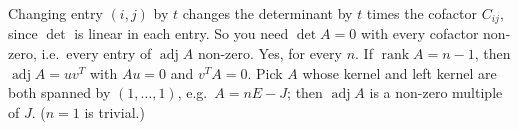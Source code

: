 \documentclass[11pt,a4paper]{article}
\begin{document}
Changing entry \((i,j)\) by \(t\) changes the determinant by \(t\) times the cofactor \(C_{ij}\), since \(\det\) is linear in each entry. So you need \(\det A=0\) with every cofactor non-zero, i.e.~every entry of \(\operatorname{adj}A\) non-zero.
Yes, for every \(n\). If \(\operatorname{rank}A=n-1\), then \(\operatorname{adj}A=uv^T\) with \(Au=0\) and \(v^TA=0\). Pick \(A\) whose kernel and left kernel are both spanned by \((1,\dots,1)\), e.g.~\(A=nE-J\); then \(\operatorname{adj}A\) is a non-zero multiple of \(J\). (\(n=1\) is trivial.)
\end{document}
